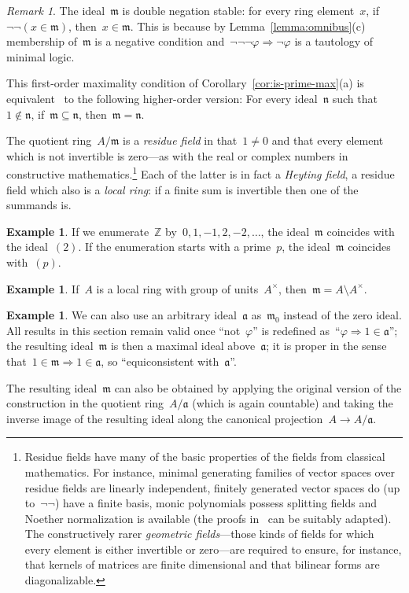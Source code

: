 \documentclass[com,11pt,crcready]{iosart2x}
\theoremstyle{definition}
\newtheorem{example}[definition]{Example}
\theoremstyle{plain}
\theoremstyle{remark}
\newtheorem{remark}[definition]{Remark}
\newcommand{\aaa}{\mathfrak{a}}
\newcommand{\mmm}{\mathfrak{m}}
\newcommand{\nnn}{\mathfrak{n}}
\newcommand{\ZZ}{\mathbb{Z}}
\renewcommand{\_}{\mathpunct{.}\,}
\begin{document}
\begin{remark}The ideal~$\mmm$ is double negation stable: for every
ring element~$x$, if~$\neg\neg(x \in \mmm)$, then~$x \in \mmm$. This is because
by Lemma~\ref{lemma:omnibus}(c) membership of~$\mmm$ is a negative condition
and~$\neg\neg\neg\varphi \Rightarrow \neg\varphi$ is a tautology of minimal
logic.\end{remark}

This first-order maximality condition of Corollary~\ref{cor:is-prime-max}(a) is
equivalent~\cite{berardi-valentini:krivine} to the following higher-order version: For every ideal~$\nnn$ such that~$1
\not\in \nnn$, if~$\mmm \subseteq \nnn$, then~$\mmm = \nnn$.

The quotient ring~$A/\mmm$ is a \emph{residue field} in that~$1 \neq 0$
and that every element which is not invertible is zero---as with the real or
complex numbers in constructive mathematics.\footnote{Residue fields have
many of the basic properties of the fields from classical mathematics. For
instance, minimal generating families of vector spaces over residue fields are
linearly independent, finitely generated vector spaces do (up to~$\neg\neg$) have
a finite basis, monic polynomials possess splitting fields and Noether
normalization is available (the proofs
in~\cite{mines-richman-ruitenburg:constructive-algebra} can be suitably
adapted). The constructively rarer \emph{geometric fields}---those kinds of
fields for which every element is either invertible or zero---are required to
ensure, for instance, that kernels of matrices are finite dimensional and that bilinear forms
are diagonalizable.}
Each of the latter is in fact a \emph{Heyting field},
a residue field which also is a \emph{local ring}: if a finite
sum is invertible then one of the summands is.

\begin{example}If we enumerate~$\ZZ$ by~$0,1,-1,2,-2,\ldots$, the
ideal~$\mmm$ coincides with the ideal~$(2)$. If the enumeration starts with a
prime~$p$, the ideal~$\mmm$ coincides with~$(p)$.\end{example}

\begin{example}If~$A$ is a local ring with group of units~$A^\times$, then~$\mmm = A \setminus A^\times$.\end{example}

\begin{example}\label{ex:maximal-above}We can also use an
arbitrary ideal~$\aaa$ as~$\mmm_0$ instead of the zero ideal. All results in
this section remain valid once ``not~$\varphi$'' is redefined
as~``$\varphi \Rightarrow 1\in\aaa$''; the resulting ideal~$\mmm$ is then a
maximal ideal above~$\aaa$; it is proper in the sense that~$1 \in \mmm
\Rightarrow 1 \in \aaa$, so ``equiconsistent with~$\aaa$''.

The resulting ideal~$\mmm$ can also be obtained by applying the original
version of the construction in the quotient ring~$A/\aaa$ (which is again
countable) and taking the inverse image of the resulting ideal along the
canonical projection~$A \to A/\aaa$.\end{example}
\end{document}
